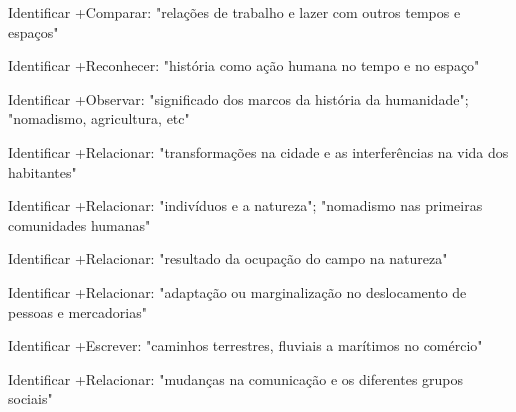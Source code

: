  Identificar +Comparar: "relações de trabalho e lazer com outros tempos e espaços"

 Identificar +Reconhecer: "história como ação humana no tempo e no espaço"

 Identificar +Observar: "significado dos marcos da história da humanidade"; "nomadismo, agricultura, etc"

 Identificar +Relacionar: "transformações na cidade e as interferências na vida dos habitantes"

 Identificar +Relacionar: "indivíduos e a natureza"; "nomadismo nas primeiras comunidades humanas"

 Identificar +Relacionar: "resultado da ocupação do campo na natureza"

 Identificar +Relacionar: "adaptação ou marginalização no deslocamento de pessoas e mercadorias"

 Identificar +Escrever: "caminhos terrestres, fluviais a marítimos no comércio"

 Identificar +Relacionar: "mudanças na comunicação e os diferentes grupos sociais"

